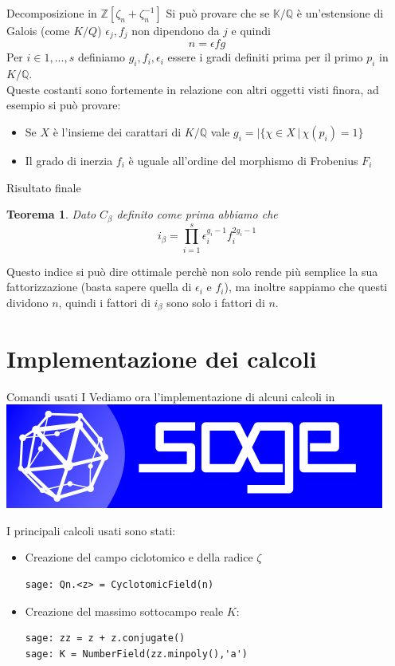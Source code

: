 \documentclass{beamer}
\theoremstyle{plain}
\newtheorem{teo}{Teorema}[section]
\theoremstyle{remark}
\theoremstyle{definition}
\newcommand{\sage}{\href{https://www.sagemath.org}{\includegraphics[height=\fontcharht\font`\B]{../images/sage.png} }}
\newcommand{\Z}{\mathbb{Z}}
\newcommand{\K}{\mathbb{K}}
\newcommand{\Q}{\mathbb{Q}}
\begin{document}
	\begin{frame}{Decomposizione in $ \Z [\zeta_n + \zeta_n^{-1}] $}
		Si può provare che se $ \K / \Q $ è un'estensione di Galois (come $ K / Q $) $ \epsilon _j, f_j $ non dipendono da $ j $ e quindi \[ n = \epsilon fg \] \pause
		Per $ i\in {1 , ... , s} $ definiamo $ g_i , f_i , \epsilon _i $ essere i gradi definiti prima per il primo $ p_i$ in $ K /\Q $.\\
		\pause
		Queste costanti sono fortemente in relazione con altri oggetti visti finora, ad esempio si può provare:
		\begin{itemize}
		\item Se $ X $ è l'insieme dei carattari di $ K / \Q $ vale $ g_i = | \{ \chi \in X \,|\, \chi(p_i)=1 \} $
		\item Il grado di inerzia $ f_i $ è uguale all'ordine del morphismo di Frobenius $ F_i $
		\end{itemize}
	\end{frame}
	
	\begin{frame}{Risultato finale}
		\begin{teo} \label{teo:idx_opt}
					Dato $ C_\beta $ definito come prima abbiamo che
					\[ i_\beta  =  \prod_{i=1}^s \epsilon _i^{g_i - 1} f_i ^{2 g_i - 1}\]
		\end{teo}
		\pause
		Questo indice si può dire ottimale perchè non solo rende più semplice la sua fattorizzazione (basta sapere quella di $ \epsilon _i $ e $ f_i $), ma inoltre sappiamo che questi dividono $ n $, quindi i fattori di $i_\beta $ sono solo i fattori di $ n $.
	\end{frame}

	\section{Implementazione dei calcoli}
	
\begin{frame}[fragile]{Comandi usati I}
Vediamo ora l'implementazione di alcuni calcoli in \sage 

I principali calcoli usati sono stati:\\ \pause

\begin{itemize}
\item Creazione del campo ciclotomico e della radice $\zeta$
\begin{lstlisting}
sage: Qn.<z> = CyclotomicField(n)
\end{lstlisting}

\item Creazione del massimo sottocampo reale $ K $:
\begin{lstlisting}
sage: zz = z + z.conjugate()
sage: K = NumberField(zz.minpoly(),'a')
\end{lstlisting}


\end{itemize}	
\end{frame}
\end{document}
